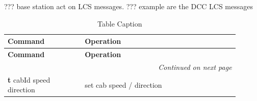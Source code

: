 
??? base station act on LCS messages. 
??? example are the DCC LCS messages 


\begin{longtable}{@{}|p{0.3\linewidth}|p{0.6\linewidth}|@{}}
    \caption{Table Caption} \\
    \toprule
    \textbf{Command} & \textbf{Operation} \\
    \midrule
    \endfirsthead
    \toprule
    \textbf{Command} & \textbf{Operation} \\
    \midrule
    \endhead
    \midrule
    \multicolumn{2}{r}{\textit{Continued on next page}} \\
    \midrule
    \endfoot
    \bottomrule
    \endlastfoot
    \textbf{t} cabId speed direction & set cab speed / direction \\
\end{longtable}


